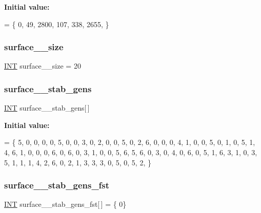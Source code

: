 {\bfseries Initial value\+:}
\begin{DoxyCode}
= \{ 
    0, 49, 2800, 107, 338, 2655, 
\}
\end{DoxyCode}
\mbox{\label{surface__7_8_c_adfc09e7944557375080f329c3d4409e4}} 
\subsubsection{\texorpdfstring{surface\+\_\+\_\+size}{surface\_7\_size}}
{\footnotesize\ttfamily \mbox{\hyperlink{galois_8h_a09fddde158a3a20bd2dcadb609de11dc}{I\+NT}} surface\+\_\+\_\+size = 20}

\mbox{\label{surface__7_8_c_a492697b7bfdcaea0ac80e69704916bc4}} 
\subsubsection{\texorpdfstring{surface\+\_\+\_\+stab\+\_\+gens}{surface\_7\_stab\_gens}}
{\footnotesize\ttfamily \mbox{\hyperlink{galois_8h_a09fddde158a3a20bd2dcadb609de11dc}{I\+NT}} surface\+\_\+\_\+stab\+\_\+gens\mbox{[}$\,$\mbox{]}}

{\bfseries Initial value\+:}
\begin{DoxyCode}
= \{
    5, 0, 0, 0, 0, 5, 0, 0, 3, 0, 2, 0, 0, 5, 0, 2, 
    6, 0, 0, 0, 4, 1, 0, 0, 5, 0, 1, 0, 5, 1, 4, 6, 
    1, 0, 0, 0, 6, 0, 6, 0, 3, 1, 0, 0, 5, 6, 5, 6, 
    0, 3, 0, 4, 0, 6, 0, 5, 1, 6, 3, 1, 0, 3, 5, 1, 
    1, 1, 4, 2, 6, 0, 2, 1, 3, 3, 3, 0, 5, 0, 5, 2, 
\}
\end{DoxyCode}
\mbox{\label{surface__7_8_c_aa2aba951f5c495fc45b18b2d2eb83dc7}} 
\subsubsection{\texorpdfstring{surface\+\_\+\_\+stab\+\_\+gens\+\_\+fst}{surface\_7\_stab\_gens\_fst}}
{\footnotesize\ttfamily \mbox{\hyperlink{galois_8h_a09fddde158a3a20bd2dcadb609de11dc}{I\+NT}} surface\+\_\+\_\+stab\+\_\+gens\+\_\+fst\mbox{[}$\,$\mbox{]} = \{ 0\}}


